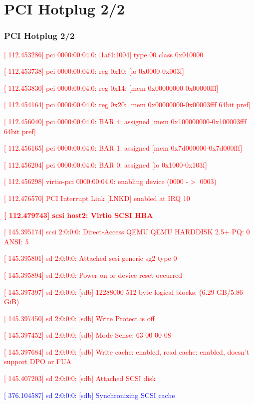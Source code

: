\documentclass[aspectratio=169]{beamer}
\begin{document}
\section{PCI Hotplug 2/2}
\begin{frame}
\frametitle{PCI Hotplug 2/2}
\begin{block}{}
\scriptsize
\textcolor{red}{[  112.453286] pci 0000:00:04.0: [1af4:1004] type 00 class 0x010000}

\textcolor{red}{[  112.453738] pci 0000:00:04.0: reg 0x10: [io  0x0000-0x003f]}

\textcolor{red}{[  112.453830] pci 0000:00:04.0: reg 0x14: [mem 0x00000000-0x00000fff]}

\textcolor{red}{[  112.454164] pci 0000:00:04.0: reg 0x20: [mem 0x00000000-0x00003fff 64bit pref]}

\textcolor{red}{[  112.456040] pci 0000:00:04.0: BAR 4: assigned [mem 0x100000000-0x100003fff 64bit pref]}

\textcolor{red}{[  112.456165] pci 0000:00:04.0: BAR 1: assigned [mem 0x7d000000-0x7d000fff]}

\textcolor{red}{[  112.456204] pci 0000:00:04.0: BAR 0: assigned [io  0x1000-0x103f]}

\textcolor{red}{[  112.456298] virtio-pci 0000:00:04.0: enabling device (0000 -$>$ 0003)}

\textcolor{red}{[  112.476570] PCI Interrupt Link [LNKD] enabled at IRQ 10}

\textbf{\textcolor{red}{[  112.479743] scsi host2: Virtio SCSI HBA}}

\textcolor{red}{[  145.395174] scsi 2:0:0:0: Direct-Access     QEMU     QEMU HARDDISK    2.5+ PQ: 0 ANSI: 5}

\textcolor{red}{[  145.395801] sd 2:0:0:0: Attached scsi generic sg2 type 0}

\textcolor{red}{[  145.395894] sd 2:0:0:0: Power-on or device reset occurred}

\textcolor{red}{[  145.397397] sd 2:0:0:0: [sdb] 12288000 512-byte logical blocks: (6.29 GB/5.86 GiB)}

\textcolor{red}{[  145.397450] sd 2:0:0:0: [sdb] Write Protect is off}

\textcolor{red}{[  145.397452] sd 2:0:0:0: [sdb] Mode Sense: 63 00 00 08}

\textcolor{red}{[  145.397684] sd 2:0:0:0: [sdb] Write cache: enabled, read cache: enabled, doesn't support DPO or FUA}

\textcolor{red}{[  145.407203] sd 2:0:0:0: [sdb] Attached SCSI disk} \newline

\textcolor{blue}{[  376.104587] sd 2:0:0:0: [sdb] Synchronizing SCSI cache}
\end{block}
\end{frame}
\end{document}
